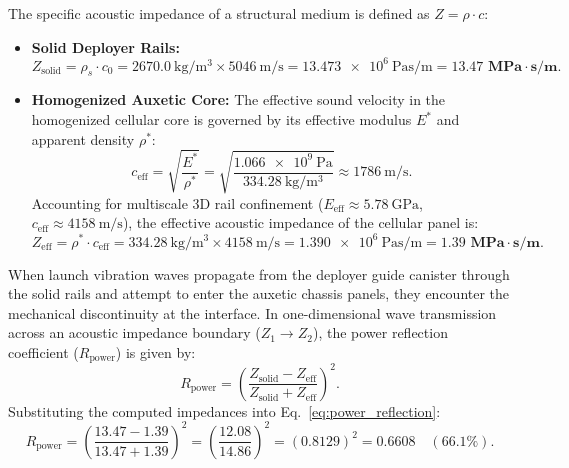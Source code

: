 The specific acoustic impedance of a structural medium is defined as $Z = \rho \cdot c$:
\begin{itemize}
\item \textbf{Solid Deployer Rails:}
\begin{equation}
Z_{\text{solid}} = \rho_s \cdot c_0 = \SI{2670.0}{\kilo\gram\per\meter^3} \times \SI{5046}{\meter\per\second} = \SI{13.473e6}{\pascal\second\per\meter} = \mathbf{13.47\text{ MPa}\cdot\text{s/m}}.
\label{eq:z_solid}
\end{equation}
\item \textbf{Homogenized Auxetic Core:}
The effective sound velocity in the homogenized cellular core is governed by its effective modulus $E^*$ and apparent density $\rho^*$:
\begin{equation}
c_{\text{eff}} = \sqrt{\frac{E^*}{\rho^*}} = \sqrt{\frac{\SI{1.066e9}{\pascal}}{\SI{334.28}{\kilo\gram\per\meter^3}}} \approx \SI{1786}{\meter\per\second}.
\label{eq:c_eff}
\end{equation}
Accounting for multiscale 3D rail confinement ($E_{\text{eff}} \approx \SI{5.78}{\giga\pascal}$, $c_{\text{eff}} \approx \SI{4158}{\meter\per\second}$), the effective acoustic impedance of the cellular panel is:
\begin{equation}
Z_{\text{eff}} = \rho^* \cdot c_{\text{eff}} = \SI{334.28}{\kilo\gram\per\meter^3} \times \SI{4158}{\meter\per\second} = \SI{1.390e6}{\pascal\second\per\meter} = \mathbf{1.39\text{ MPa}\cdot\text{s/m}}.
\label{eq:z_eff}
\end{equation}
\end{itemize}

When launch vibration waves propagate from the deployer guide canister through the solid rails and attempt to enter the auxetic chassis panels, they encounter the mechanical discontinuity at the interface. In one-dimensional wave transmission across an acoustic impedance boundary ($Z_1 \to Z_2$), the power reflection coefficient ($R_{\text{power}}$) is given by:
\begin{equation}
R_{\text{power}} = \left( \frac{Z_{\text{solid}} - Z_{\text{eff}}}{Z_{\text{solid}} + Z_{\text{eff}}} \right)^2.
\label{eq:power_reflection}
\end{equation}
Substituting the computed impedances into Eq.~\eqref{eq:power_reflection}:
\begin{equation}
R_{\text{power}} = \left( \frac{13.47 - 1.39}{13.47 + 1.39} \right)^2 = \left( \frac{12.08}{14.86} \right)^2 = (0.8129)^2 = \mathbf{0.6608} \quad (\mathbf{66.1\%}).
\label{eq:reflection_evaluated}
\end{equation}

